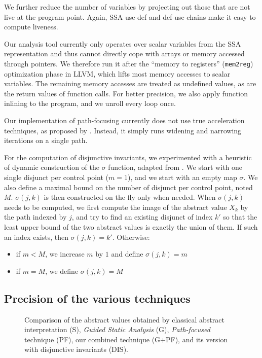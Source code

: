 \documentclass[preprint]{sigplanconf}
\begin{document}
We further reduce the number of variables by projecting out those that are not live at the program point. Again, SSA use-def and def-use chains make it easy to compute liveness.

Our analysis tool currently only operates over scalar variables from the SSA representation and thus cannot directly cope with arrays or memory accessed through pointers. We therefore run it after the ``memory to registers'' (\texttt{mem2reg}) optimization phase in LLVM, which lifts most memory accesses to scalar variables.
The remaining memory accesses are treated as undefined values, as are the return
values of function calls. For better precision, we also apply function inlining
to the program, and we unroll every loop once.

Our implementation of path-focusing currently does not use true acceleration techniques, as proposed by \citet{Monniaux_Gonnord_SAS11}. Instead, it simply runs widening and narrowing iterations on a single path.

For the computation of disjunctive invariants, we experimented with a heuristic
of dynamic construction of the $\sigma$ function, adapted from
\cite{DBLP:conf/pldi/GulwaniZ10}.  We start with one single
disjunct per control point ($m=1$), and we start with an empty map $\sigma$. We also
define a maximal bound on the number of disjunct per control point, noted $M$.
$\sigma(j,k)$ is then constructed on the fly only when needed.
When $\sigma(j,k)$ needs to be computed, we first compute the image of the
abstract value $X_k$ by the path indexed by $j$, and try to find an existing
disjunct of index $k'$ so that the least upper bound of the two abstract values is
exactly the union of them. If such an index exists, then $\sigma(j,k) = k'$.
Otherwise:
\begin{itemize}
	\item if $m < M$, we increase $m$ by $1$ and define $\sigma(j,k) = m$
	\item if $m = M$, we define $\sigma(j,k) = M$
\end{itemize}


\subsection{Precision of the various techniques}
\label{sec:compare_techniques}

\begin{figure}[h]
  \begin{center}
    
  \end{center} 
  \vspace{-20px}
  \caption{Comparison of the abstract values obtained by classical abstract
  interpretation (S), \emph{Guided Static
  Analysis} (G), \emph{Path-focused} technique (PF), our combined technique
  (G+PF), and its version with disjunctive invariants (DIS).}
  \label{fig:techniques}
\end {figure}
\end{document}
